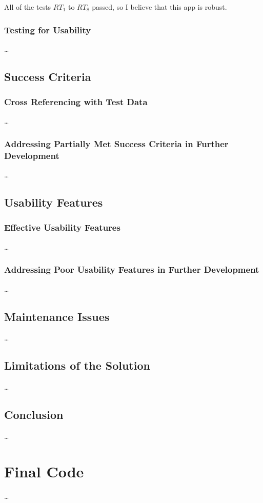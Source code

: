 \documentclass[12pt]{report}
\begin{document}
All of the tests $RT_{1}$ to $RT_{8}$ passed, so I believe that this app is robust.

\subsection{Testing for Usability}\label{sec:testingUsability}
\dots{}

\section{Success Criteria}
\subsection{Cross Referencing with Test Data}
\dots{}

\subsection{Addressing Partially Met Success Criteria in Further Development}
\dots{}

\section{Usability Features}
\subsection{Effective Usability Features}
\dots{}

\subsection{Addressing Poor Usability Features in Further Development}
\dots{}

\section{Maintenance Issues}
\dots{}

\section{Limitations of the Solution}
\dots{}

\section{Conclusion}
\dots{}

\appendix
\chapter{Final Code}\label{sec:finalCode}
\dots{}
\end{document}
